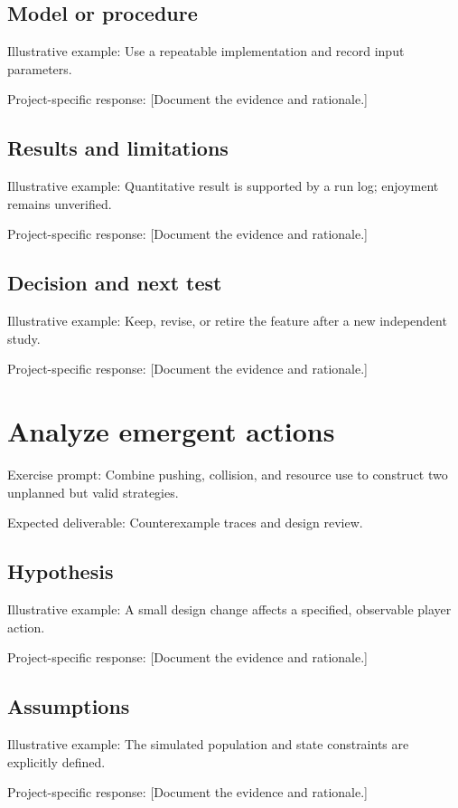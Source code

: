 \documentclass[11pt]{article}
\begin{document}
\subsection{Model or procedure}
Illustrative example: Use a repeatable implementation and record input parameters.

Project-specific response: [Document the evidence and rationale.]


\subsection{Results and limitations}
Illustrative example: Quantitative result is supported by a run log; enjoyment remains unverified.

Project-specific response: [Document the evidence and rationale.]


\subsection{Decision and next test}
Illustrative example: Keep, revise, or retire the feature after a new independent study.

Project-specific response: [Document the evidence and rationale.]


\section{Analyze emergent actions}
Exercise prompt: Combine pushing, collision, and resource use to construct two unplanned but valid strategies.

Expected deliverable: Counterexample traces and design review.


\subsection{Hypothesis}
Illustrative example: A small design change affects a specified, observable player action.

Project-specific response: [Document the evidence and rationale.]


\subsection{Assumptions}
Illustrative example: The simulated population and state constraints are explicitly defined.

Project-specific response: [Document the evidence and rationale.]
\end{document}
